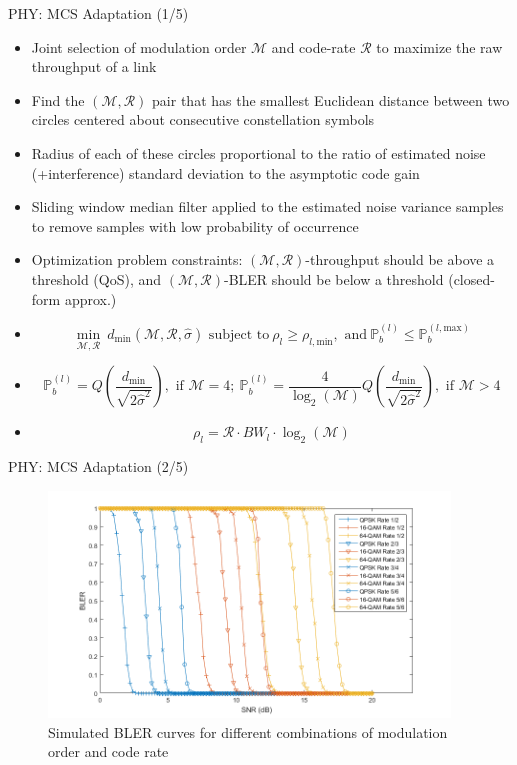 \documentclass{beamer}
\begin{document}
\begin{frame}{PHY: MCS Adaptation (1/5)}
    \footnotesize{\begin{itemize}
        \item Joint selection of modulation order $\mathcal{M}$ and code-rate $\mathcal{R}$ to maximize the raw throughput of a link
        \item Find the $(\mathcal{M},\mathcal{R})$ pair that has the smallest Euclidean distance between two circles centered about consecutive constellation symbols
        \item Radius of each of these circles proportional to the ratio of estimated noise (+interference) standard deviation to the asymptotic code gain
        \item Sliding window median filter applied to the estimated noise variance samples to remove samples with low probability of occurrence
        \item Optimization problem constraints: $(\mathcal{M},\mathcal{R})$-throughput should be above a threshold (QoS), and $(\mathcal{M},\mathcal{R})$-BLER should be below a threshold (closed-form approx.)
        \item \[\min_{\mathcal{M},\mathcal{R}}\ d_{\text{min}}(\mathcal{M},\mathcal{R},\hat{\sigma}) \text{ subject to}\ \rho_{l} \geq \rho_{l,\text{min}},\text{ and}\ \mathbb{P}_{b}^{(l)} \leq \mathbb{P}_{b}^{(l,\text{max})}\]
        \item \[\mathbb{P}_{b}^{(l)}=Q\left(\frac{d_{\text{min}}}{\sqrt{2\hat{\sigma}^{2}}}\right),\text{ if $\mathcal{M}=4$};\ \mathbb{P}_{b}^{(l)}=\frac{4}{\log_{2}(\mathcal{M})}Q\left(\frac{d_{\text{min}}}{\sqrt{2\hat{\sigma}^{2}}}\right),\text{ if $\mathcal{M}>4$}\]
        \item \[\rho_{l}=\mathcal{R} \cdot BW_{l} \cdot \log_{2}(\mathcal{M})\]
    \end{itemize}}
\end{frame}
\begin{frame}{PHY: MCS Adaptation (2/5)}
\begin{figure}
    \centering
    \includegraphics[width = 0.95\textwidth]{BLER.png}
    \caption{Simulated BLER curves for different combinations of modulation order and code rate}
    \label{fig:7}
\end{figure}
\end{frame}
\end{document}
